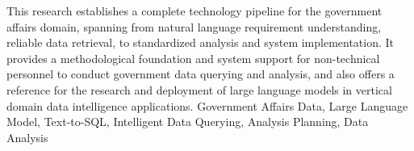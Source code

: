 {This research establishes a complete technology pipeline for the government affairs domain, spanning from natural language requirement understanding, reliable data retrieval, to standardized analysis and system implementation. It provides a methodological foundation and system support for non-technical personnel to conduct government data querying and analysis, and also offers a reference for the research and deployment of large language models in vertical domain data intelligence applications.
}
{Government Affairs Data, Large Language Model, Text-to-SQL, Intelligent Data Querying, Analysis Planning, Data Analysis}	%